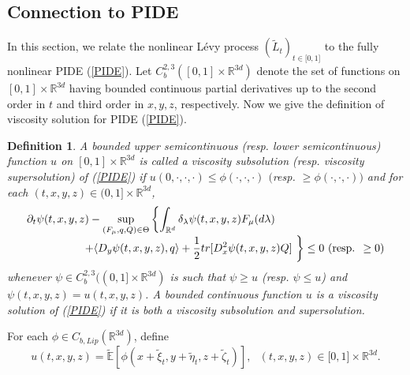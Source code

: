 \documentclass[a4paper,oneside,10pt]{article}%
\newtheorem{definition}[theorem]{Definition}
\numberwithin{equation}{section}
\begin{document}
\subsection{Connection to PIDE}

\label{Section_connection PIDE}

In this section, we relate the nonlinear L\'{e}vy process $(\tilde{L}%
_{t})_{t\in \lbrack0,1]}$ to the fully nonlinear PIDE (\ref{PIDE}). Let
$C_{b}^{2,3}([0,1]\times \mathbb{R}^{3d})$ denote the set of functions on
$[0,1]\times \mathbb{R}^{3d}$ having bounded continuous partial derivatives up
to the second order in $t$ and third order in $x,y,z$, respectively. Now we
give the definition of viscosity solution for PIDE (\ref{PIDE}).

\begin{definition}
A bounded upper semicontinuous (resp. lower semicontinuous) function $u$ on
$[0,1]\times \mathbb{R}^{3d}$ is called a viscosity subsolution (resp.
viscosity supersolution) of (\ref{PIDE}) if $u(0,\cdot,\cdot,\cdot)\leq
\phi(\cdot,\cdot,\cdot)$ $($resp. $\geq \phi(\cdot,\cdot,\cdot))$ and for each
$(t,x,y,z)\in(0,1]\times \mathbb{R}^{3d}$,
\[%
\begin{array}
[c]{l}%
\displaystyle \partial_{t}\psi(t,x,y,z)-\sup \limits_{(F_{\mu},q,Q)\in \Theta
}\left \{  \int_{\mathbb{R}^{d}}\delta_{\lambda}\psi(t,x,y,z)F_{\mu}%
(d\lambda)\right. \\
\displaystyle \text{\  \  \  \  \  \  \  \  \  \  \  \  \  \  \ }\left.  +\langle D_{y}%
\psi(t,x,y,z),q\rangle+\frac{1}{2}tr[D_{x}^{2}\psi(t,x,y,z)Q]\text{ }\right \}
\leq0\text{ }(\text{resp. }\geq0)
\end{array}
\]
whenever $\psi \in C_{b}^{2,3}((0,1]\times \mathbb{R}^{3d})$ is such that
$\psi \geq u$ (resp. $\psi \leq u$) and $\psi(t,x,y,z)=u(t,x,y,z)$. A bounded
continuous function $u$ is a viscosity solution of (\ref{PIDE}) if it is both
a viscosity subsolution and supersolution.
\end{definition}

For each $\phi \in C_{b,Lip}(\mathbb{R}^{3d})$, define
\begin{equation}
u(t,x,y,z)=\mathbb{\tilde{E}}[\phi(x+\tilde{\xi}_{t},y+\tilde{\eta}
_{t},z+\tilde{\zeta}_{t})],\text{ }(t,x,y,z)\in \lbrack0,1]\times
\mathbb{R}^{3d}. \label{u}%
\end{equation}
\end{document}
